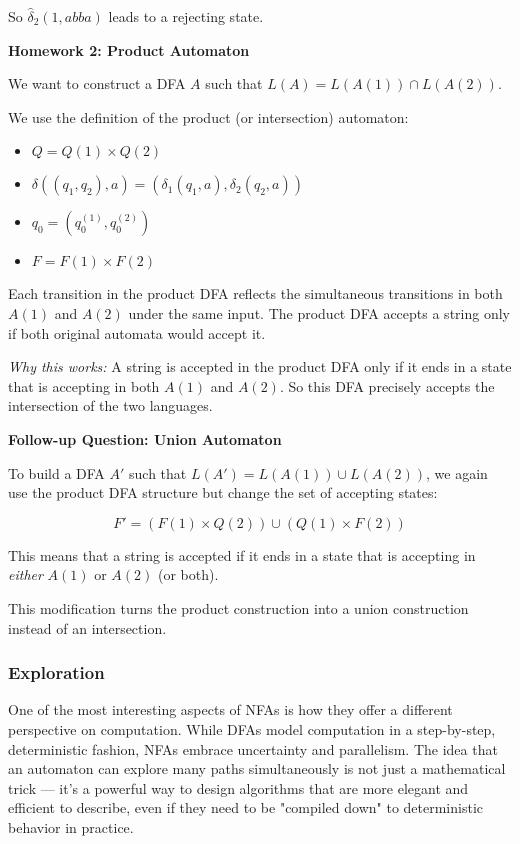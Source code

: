\documentclass{article}
\theoremstyle{theorem}
\theoremstyle{definition}
\theoremstyle{remark}
\begin{document}
So $\hat{\delta}_2(1, abba)$ leads to a rejecting state.

\textbf{Homework 2: Product Automaton}

We want to construct a DFA $A$ such that $L(A) = L(A(1)) \cap L(A(2))$.

We use the definition of the product (or intersection) automaton:

\begin{itemize}
  \item $Q = Q(1) \times Q(2)$
  \item $\delta((q_1, q_2), a) = (\delta_1(q_1, a), \delta_2(q_2, a))$
  \item $q_0 = (q_0^{(1)}, q_0^{(2)})$
  \item $F = F(1) \times F(2)$
\end{itemize}

Each transition in the product DFA reflects the simultaneous transitions in both $A(1)$ and $A(2)$ under the same input. The product DFA accepts a string only if both original automata would accept it.

\textit{Why this works:} A string is accepted in the product DFA only if it ends in a state that is accepting in both $A(1)$ and $A(2)$. So this DFA precisely accepts the intersection of the two languages.

\textbf{Follow-up Question: Union Automaton}

To build a DFA $A'$ such that $L(A') = L(A(1)) \cup L(A(2))$, we again use the product DFA structure but change the set of accepting states:

\[
F' = (F(1) \times Q(2)) \cup (Q(1) \times F(2))
\]

This means that a string is accepted if it ends in a state that is accepting in \textit{either} $A(1)$ or $A(2)$ (or both).

This modification turns the product construction into a union construction instead of an intersection.


\subsubsection{Exploration}

One of the most interesting aspects of NFAs is how they offer a different perspective on computation. While DFAs model computation in a step-by-step, deterministic fashion, NFAs embrace uncertainty and parallelism. The idea that an automaton can explore many paths simultaneously is not just a mathematical trick — it's a powerful way to design algorithms that are more elegant and efficient to describe, even if they need to be "compiled down" to deterministic behavior in practice.
\end{document}

